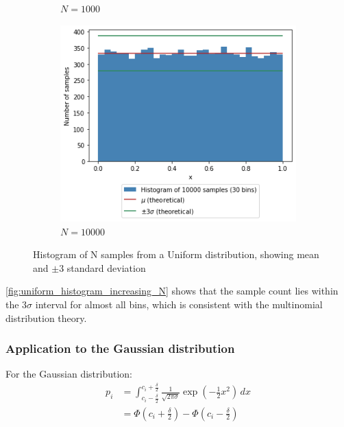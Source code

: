 \documentclass[a4paper]{article}
\begin{document}
\begin{figure}[h]
\begin{subfigure}[b]{0.3\textwidth}
        \caption{$N=1000$}
        \label{fig:uniform_histogram_1000}
    \end{subfigure}
    \hfill
    \begin{subfigure}[b]{0.3\textwidth}
        \centering
        \includegraphics[width=\textwidth]{figures/uniform_histogram_10000.png}
        \caption{$N=10000$}
        \label{fig:uniform_histogram_10000}
    \end{subfigure}
    \caption{Histogram of N samples from a Uniform distribution, showing mean and $\pm3$ standard deviation}
    \label{fig:uniform_histogram_increasing_N}
\end{figure}

\autoref{fig:uniform_histogram_increasing_N} shows that the sample count lies within the $3\sigma$ interval for almost
all bins, which is consistent with the multinomial distribution theory.


\subsubsection{Application to the Gaussian distribution}

For the Gaussian distribution:
\begin{align*}
        p_i &= \int_{c_i - \frac{\delta}{2}}^{c_i + \frac{\delta}{2}} \frac{1}{\sqrt{2 \pi \sigma}} \exp \left(-\frac{1}{2} x^2 \right) \,dx \\
        &= \Phi \left(c_i + \frac{\delta}{2}\right)- \Phi\left(c_i - \frac{\delta}{2}\right)
\end{align*}
\end{document}
